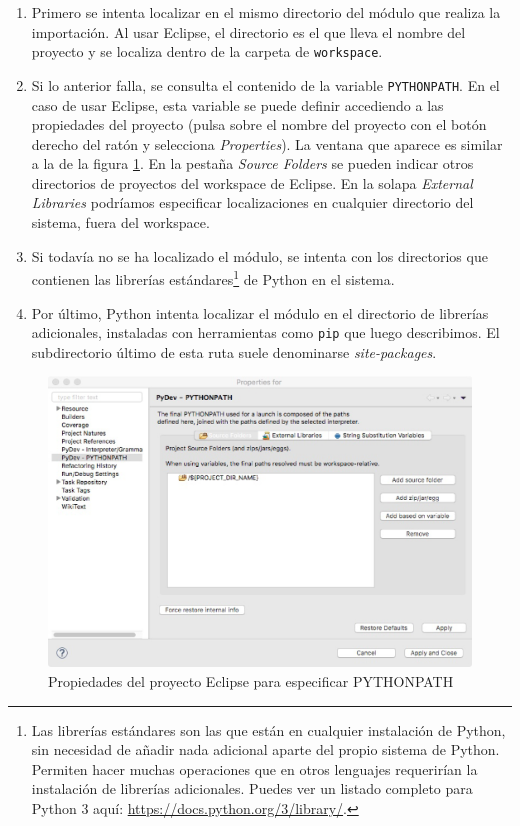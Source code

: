 {\begin{enumerate}
	\item Primero se intenta localizar en el mismo directorio del módulo que realiza la importación. Al usar Eclipse, el directorio es el que lleva el nombre del proyecto y se localiza dentro de la carpeta de \texttt{workspace}.
	\item Si lo anterior falla, se consulta el contenido de la variable \texttt{PYTHONPATH}. En el caso de usar Eclipse, esta variable se puede definir accediendo a las propiedades del proyecto (pulsa sobre el nombre del proyecto con el botón derecho del ratón y selecciona \emph{Properties}). La ventana que aparece es similar a la de la figura \ref{fig:pythonpath}. En la pestaña \emph{Source Folders} se pueden indicar otros directorios de proyectos del workspace de Eclipse. En la solapa \emph{External Libraries} podríamos especificar localizaciones en cualquier directorio del sistema, fuera del workspace.
	\item Si todavía no se ha localizado el módulo, se intenta con los directorios que contienen las librerías estándares\footnote{Las librerías estándares son las que están en cualquier instalación de Python, sin necesidad de añadir nada adicional aparte del propio sistema de Python. Permiten hacer muchas operaciones que en otros lenguajes requerirían la instalación de librerías adicionales. Puedes ver un listado completo para Python 3 aquí: \url{https://docs.python.org/3/library/}.} de Python en el sistema.
	\item Por último, Python intenta localizar el módulo en el directorio de librerías adicionales, instaladas con herramientas como \texttt{pip} que luego describimos. El subdirectorio último de esta ruta suele denominarse \emph{site-packages}.
\end{enumerate}

\begin{figure}
\begin{center}
\includegraphics[height=0.45\textwidth]{imagenes/pythonpath}
\end{center}
\caption{Propiedades del proyecto Eclipse para especificar PYTHONPATH}
\label{fig:pythonpath}
\end{figure}

}
